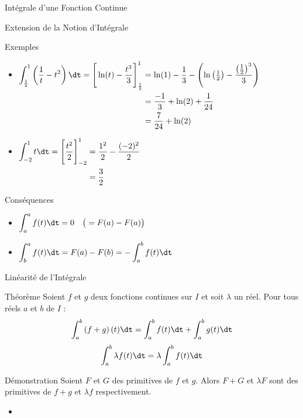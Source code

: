 \documentclass{cours}
\begin{document}
\begin{Gpartie}{Intégrale d'une Fonction Continue}
\begin{Spartie}{Extension de la Notion d'Intégrale}
\begin{SSpartie}{Exemples}
\begin{itemize}
                    \item 
                    $\begin{aligned}[t]
                        \int_\frac{1}{2}^1\left(\frac{1}{t}-t^2\right)\dt=\Bigg[\ln(t)-\frac{t^3}{3}\Bigg]_\frac{1}{2}^1&=\ln(1)-\frac{1}{3}-\left(\ln\left(\tfrac{1}{2}\right)-\frac{\left(\frac{1}{2}\right)^3}{3}\right) \\
                        &=\frac{-1}{3}+\ln(2)+\frac{1}{24} \\
                        &=\frac{7}{24}+\ln(2)
                    \end{aligned}$
                    \item 
                    $\begin{aligned}[t]
                        \int_{-2}^1t\dt=\Bigg[\frac{t^2}{2}\Bigg]_{-2}^1&=\frac{1^2}{2}-\frac{(-2)^2}{2} \\
                        &=\frac{3}{2}
                    \end{aligned}$
                \end{itemize}
            \end{SSpartie}
            \pagebreak
            \begin{SSpartie}{Conséquences} 
                \begin{itemize}
                    \item $\displaystyle\int_a^af(t)\dt=0\quad\big(=F(a)-F(a)\big)$
                    \item $\displaystyle\int_b^af(t)\dt=F(a)-F(b)=-\int_a^b f(t)\dt$
                \end{itemize}
            \end{SSpartie}
        \end{Spartie}
        \begin{Spartie}{Linéarité de l'Intégrale} 
            \begin{SSpartie}{Théorème} 
                Soient $f$ et $g$ deux fonctions continues sur $I$ et soit $\lambda$ un réel. Pour tous réels $a$ et $b$ de $I$ : \[\int_a^b\left(f+g\right)(t)\dt=\int_a^b f(t)\dt+\int_a^bg(t)\dt\] \[\int_a^b\lambda f(t)\dt=\lambda\int_a^b f(t)\dt\]
                \begin{SSSpartie}{Démonstration} 
                    Soient $F$ et $G$ des primitives de $f$ et $g$. Alors $F+G$ et $\lambda F$ sont des primitives de $f+g$ et $\lambda f$ respectivement.
                    \begin{itemize}
                        \item 

\end{itemize}
\end{SSSpartie}
\end{SSpartie}
\end{Spartie}
\end{Gpartie}
\end{document}
